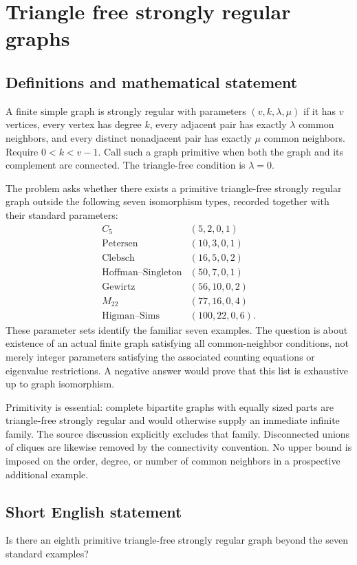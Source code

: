 \documentclass[11pt,a4paper]{article}
\begin{document}
\section*{Triangle free strongly regular graphs}\label{statement}

\subsection{Definitions and mathematical statement}
A finite simple graph is strongly regular with parameters $(v,k,\lambda,\mu)$ if it has $v$ vertices, every vertex has degree $k$, every adjacent pair has exactly $\lambda$ common neighbors, and every distinct nonadjacent pair has exactly $\mu$ common neighbors. Require $0<k<v-1$. Call such a graph primitive when both the graph and its complement are connected. The triangle-free condition is $\lambda=0$.

The problem asks whether there exists a primitive triangle-free strongly regular graph outside the following seven isomorphism types, recorded together with their standard parameters:
\[
\begin{array}{c|c}
 C_5&(5,2,0,1)\\
 \text{Petersen}&(10,3,0,1)\\
 \text{Clebsch}&(16,5,0,2)\\
 \text{Hoffman--Singleton}&(50,7,0,1)\\
 \text{Gewirtz}&(56,10,0,2)\\
 M_{22}&(77,16,0,4)\\
 \text{Higman--Sims}&(100,22,0,6).
\end{array}
\]
These parameter sets identify the familiar seven examples. The question is about existence of an actual finite graph satisfying all common-neighbor conditions, not merely integer parameters satisfying the associated counting equations or eigenvalue restrictions. A negative answer would prove that this list is exhaustive up to graph isomorphism.

Primitivity is essential: complete bipartite graphs with equally sized parts are triangle-free strongly regular and would otherwise supply an immediate infinite family. The source discussion explicitly excludes that family. Disconnected unions of cliques are likewise removed by the connectivity convention. No upper bound is imposed on the order, degree, or number of common neighbors in a prospective additional example.
\subsection{Short English statement}
Is there an eighth primitive triangle-free strongly regular graph beyond the seven standard examples?
\end{document}
